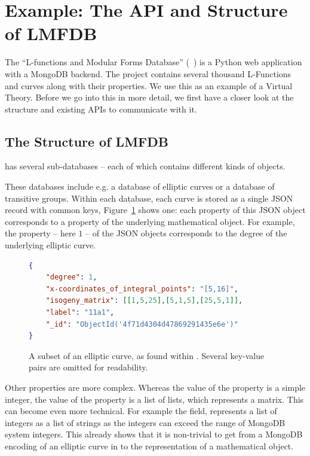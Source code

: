 \section{Example: The API and Structure of LMFDB}\label{sec:sota}

The ``L-functions and Modular Forms Database'' (\lmfdb~\cite{lmfdb}) is a Python web application with a MongoDB backend. 
The project contains several thousand L-Functions and curves along with their properties. 
We use this as an example of a Virtual Theory. 
Before we go into this in more detail, we first have a closer look at the structure and existing APIs to communicate with it.

\subsection{The Structure of LMFDB}\label{sec:sota:struct}

\lmfdb has several sub-databases -- each of which contains different kinds of objects.

These databases include e.g. a database of elliptic curves or a database of transitive groups. 
Within each database, each curve is stored as a single JSON record with common keys, Figure~\ref{fig:lmfdbexample} shows one: each property of this JSON object corresponds to a property of the underlying mathematical object. 
For example, the  property -- here $1$ -- of the JSON objects corresponds to the degree of the underlying elliptic curve. 

\begin{figure}[ht]\centering
      \begin{lstlisting}[language=json]
{
    "degree": 1,
    "x-coordinates_of_integral_points": "[5,16]",
    "isogeny_matrix": [[1,5,25],[5,1,5],[25,5,1]],
    "label": "11a1",
    "_id": "ObjectId('4f71d4304d47869291435e6e')"
}
      \end{lstlisting}\vspace*{-1.5em}
  \caption[An elliptic curve from \lmfdb]{
    A subset of an elliptic curve, as found within \lmfdb. 
    Several key-value pairs are omitted for readability. 
  }
  \label{fig:lmfdbexample}
\end{figure}

Other properties are more complex.
Whereas the value of the  property is a simple integer, the value of the  property is a list of lists, which represents a matrix. 
This can become even more technical. 
For example the  field, \lmfdb represents a list of integers as a list of strings as the integers can exceed the range of MongoDB system integers. 
This already shows that it is non-trivial to get from a MongoDB encoding of an elliptic curve in \lmfdb to the representation of a mathematical object. 


